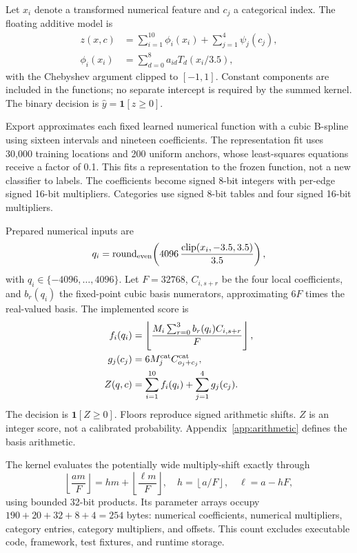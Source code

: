 \documentclass{ieeeaccess}
\newcommand{\floor}[1]{\left\lfloor #1\right\rfloor}
\begin{document}
Let $x_i$ denote a transformed numerical feature and $c_j$ a categorical index. The floating additive model is
\begin{equation}
\begin{split}
z(x,c)&=\sum_{i=1}^{10}\phi_i(x_i)+\sum_{j=1}^{4}\psi_j(c_j),\\
\phi_i(x_i)&=\sum_{d=0}^{8}a_{id}T_d(x_i/3.5),
\end{split}
\label{eq:additive}
\end{equation}
with the Chebyshev argument clipped to $[-1,1]$. Constant components are included in the functions; no separate intercept is required by the summed kernel. The binary decision is $\widehat y=\mathbf 1[z\geq0]$.

Export approximates each fixed learned numerical function with a cubic B-spline using sixteen intervals and nineteen coefficients. The representation fit uses 30,000 training locations and 200 uniform anchors, whose least-squares equations receive a factor of 0.1. This fits a representation to the frozen function, not a new classifier to labels. The coefficients become signed 8-bit integers with per-edge signed 16-bit multipliers. Categories use signed 8-bit tables and four signed 16-bit multipliers.

Prepared numerical inputs are
\begin{equation}
q_i=\operatorname{round}_{\rm even}\!\left(4096\,\frac{\operatorname{clip}(x_i,-3.5,3.5)}{3.5}\right),
\end{equation}
with $q_i\in\{-4096,\ldots,4096\}$. Let $F=32768$, $C_{i,s+r}$ be the four local coefficients, and $b_r(q_i)$ the fixed-point cubic basis numerators, approximating $6F$ times the real-valued basis. The implemented score is
\begin{align}
f_i(q_i)&=\floor{\frac{M_i\sum_{r=0}^{3}b_r(q_i)C_{i,s+r}}{F}},\\
g_j(c_j)&=6M^{\rm cat}_j C^{\rm cat}_{o_j+c_j},\\
Z(q,c)&=\sum_{i=1}^{10}f_i(q_i)+\sum_{j=1}^{4}g_j(c_j).
\label{eq:integer}
\end{align}
The decision is $\mathbf1[Z\geq0]$. Floors reproduce signed arithmetic shifts. $Z$ is an integer score, not a calibrated probability. Appendix~\ref{app:arithmetic} defines the basis arithmetic.

The kernel evaluates the potentially wide multiply-shift exactly through
\begin{equation}
\floor{\frac{am}{F}}=hm+\floor{\frac{\ell m}{F}},\quad
h=\floor{a/F},\quad \ell=a-hF,
\end{equation}
using bounded 32-bit products. Its parameter arrays occupy $190+20+32+8+4=254$ bytes: numerical coefficients, numerical multipliers, category entries, category multipliers, and offsets. This count excludes executable code, framework, test fixtures, and runtime storage.
\end{document}
